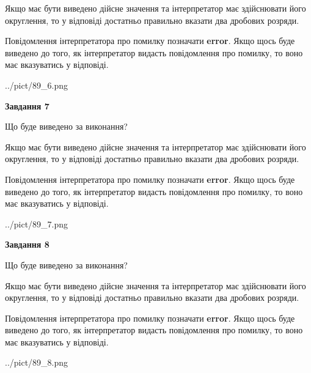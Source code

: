 \documentclass[12pt, ukrainian]{article}
\begin{document}
{\begin {Large}
Якщо має бути виведено дійсне значення та інтерпретатор має здійснювати його округлення, 
то у відповіді достатньо правильно вказати два дробових розряди.

Повідомлення інтерпретатора про помилку позначати \textbf{error}.
Якщо щось буде виведено до того, як інтерпретатор видасть повідомлення про помилку, 
то воно має вказуватись у відповіді. \par

\begin{center}
	{../pict/89_6.png}
\end{center}
\newpage

{\begin {center}\textbf{Завдання 7}\end {center}}\par
Що буде виведено за виконання? \par

Якщо має бути виведено дійсне значення та інтерпретатор має здійснювати його округлення, 
то у відповіді достатньо правильно вказати два дробових розряди.

Повідомлення інтерпретатора про помилку позначати \textbf{error}.
Якщо щось буде виведено до того, як інтерпретатор видасть повідомлення про помилку, 
то воно має вказуватись у відповіді. \par

\begin{center}
	{../pict/89_7.png}
\end{center}
\newpage

{\begin {center}\textbf{Завдання 8}\end {center}}\par
Що буде виведено за виконання? \par

Якщо має бути виведено дійсне значення та інтерпретатор має здійснювати його округлення, 
то у відповіді достатньо правильно вказати два дробових розряди.

Повідомлення інтерпретатора про помилку позначати \textbf{error}.
Якщо щось буде виведено до того, як інтерпретатор видасть повідомлення про помилку, 
то воно має вказуватись у відповіді. \par

\begin{center}
	{../pict/89_8.png}
\end{center}
\newpage


\end{Large}}
\end{document}
